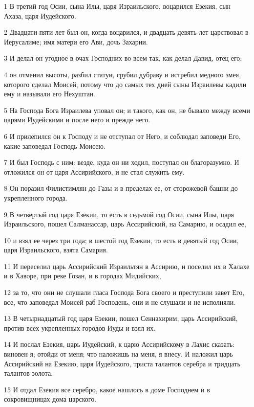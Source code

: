 \par 1 В третий год Осии, сына Илы, царя Израильского, воцарился Езекия, сын Ахаза, царя Иудейского.
\par 2 Двадцати пяти лет был он, когда воцарился, и двадцать девять лет царствовал в Иерусалиме; имя матери его Ави, дочь Захарии.
\par 3 И делал он угодное в очах Господних во всем так, как делал Давид, отец его;
\par 4 он отменил высоты, разбил статуи, срубил дубраву и истребил медного змея, которого сделал Моисей, потому что до самых тех дней сыны Израилевы кадили ему и называли его Нехуштан.
\par 5 На Господа Бога Израилева уповал он; и такого, как он, не бывало между всеми царями Иудейскими и после него и прежде него.
\par 6 И прилепился он к Господу и не отступал от Него, и соблюдал заповеди Его, какие заповедал Господь Моисею.
\par 7 И был Господь с ним: везде, куда он ни ходил, поступал он благоразумно. И отложился он от царя Ассирийского, и не стал служить ему.
\par 8 Он поразил Филистимлян до Газы и в пределах ее, от сторожевой башни до укрепленного города.
\par 9 В четвертый год царя Езекии, то есть в седьмой год Осии, сына Илы, царя Израильского, пошел Салманассар, царь Ассирийский, на Самарию, и осадил ее,
\par 10 и взял ее через три года; в шестой год Езекии, то есть в девятый год Осии, царя Израильского, взята Самария.
\par 11 И переселил царь Ассирийский Израильтян в Ассирию, и поселил их в Халахе и в Хаворе, при реке Гозан, и в городах Мидийских,
\par 12 за то, что они не слушали гласа Господа Бога своего и преступили завет Его, все, что заповедал Моисей раб Господень, они и не слушали и не исполняли.
\par 13 В четырнадцатый год царя Езекии, пошел Сеннахирим, царь Ассирийский, против всех укрепленных городов Иуды и взял их.
\par 14 И послал Езекия, царь Иудейский, к царю Ассирийскому в Лахис сказать: виновен я; отойди от меня; что наложишь на меня, я внесу. И наложил царь Ассирийский на Езекию, царя Иудейского, триста талантов серебра и тридцать талантов золота.
\par 15 И отдал Езекия все серебро, какое нашлось в доме Господнем и в сокровищницах дома царского.

